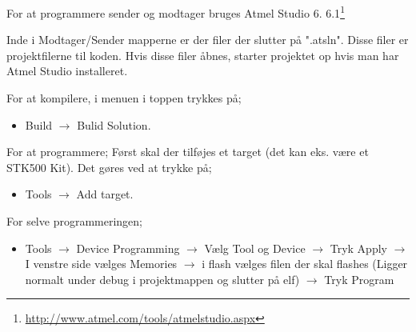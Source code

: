 \documentclass[Main]{subfiles}
\begin{document}
For at programmere sender og modtager bruges Atmel Studio 6. 6.1\footnote{\url{http://www.atmel.com/tools/atmelstudio.aspx}} 

Inde i Modtager/Sender mapperne er der filer der slutter på ".atsln". Disse filer er projektfilerne til koden. Hvis disse filer åbnes, starter projektet op hvis man har Atmel Studio installeret.

For at kompilere, i menuen i toppen trykkes på;
\begin{itemize}
\item Build $\rightarrow$ Bulid Solution.
\end{itemize}

For at programmere;
Først skal der tilføjes et target (det kan eks. være et STK500 Kit). Det gøres ved at trykke på;
\begin{itemize}
\item Tools $\rightarrow$ Add target.
\end{itemize}
For selve programmeringen;
\begin{itemize}
\item Tools $\rightarrow$ Device Programming $\rightarrow$ Vælg Tool og Device $\rightarrow$ Tryk Apply $\rightarrow$ I venstre side vælges Memories $\rightarrow$ i flash vælges filen der skal flashes (Ligger normalt under debug i projektmappen og slutter på elf) $\rightarrow$ Tryk Program
\end{itemize}
\end{document}
